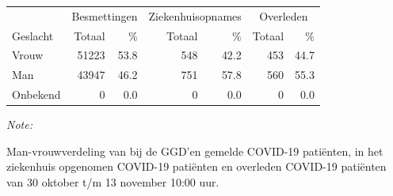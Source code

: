 \documentclass[
  english,
  man,floatsintext]{apa6}
\begin{document}
\begin{table}[H]
\centering\begingroup\fontsize{11}{13}\selectfont

\begin{threeparttable}
\begin{tabular}{lrrrrrr}
\toprule
\multicolumn{1}{c}{ } & \multicolumn{2}{c}{Besmettingen} & \multicolumn{2}{c}{Ziekenhuisopnames} & \multicolumn{2}{c}{Overleden} \\
\cmidrule(l{3pt}r{3pt}){2-3} \cmidrule(l{3pt}r{3pt}){4-5} \cmidrule(l{3pt}r{3pt}){6-7}
Geslacht & Totaal & \% & Totaal & \% & Totaal & \%\\
\midrule
Vrouw & 51223 & 53.8 & 548 & 42.2 & 453 & 44.7\\
Man & 43947 & 46.2 & 751 & 57.8 & 560 & 55.3\\
Onbekend & 0 & 0.0 & 0 & 0.0 & 0 & 0.0\\
\bottomrule
\end{tabular}
\begin{tablenotes}
\item \textit{Note: } 
\item Man-vrouwverdeling van bij de GGD’en gemelde COVID-19 patiënten, in het ziekenhuis opgenomen COVID-19 patiënten en overleden COVID-19 patiënten van 30 oktober t/m 13 november 10:00 uur.
\end{tablenotes}
\end{threeparttable}
\endgroup{}
\end{table}
\newpage
\end{document}
